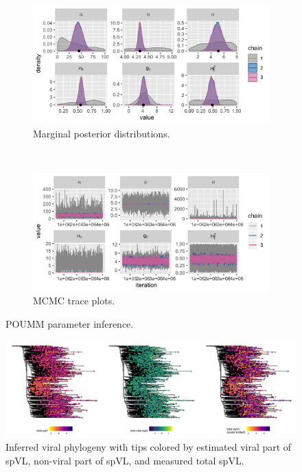 \documentclass[]{article}
\begin{document}
\begin{doublespace}
\begin{figure}[H]
	\centering
	\begin{subfigure}[b]{0.75\textwidth}
		\includegraphics[width=\linewidth]{figures/200207_POUMM_posteriors_zoomed.png}
		\caption{Marginal posterior distributions.}
	\end{subfigure}
~
	\begin{subfigure}[b]{0.75\textwidth}
		\includegraphics[width=\linewidth]{figures/200207_POUMM_traces.png}
		\caption{MCMC trace plots.}
	\end{subfigure}
	\caption{POUMM parameter inference.}\label{fig:poumm-fit}
\end{figure}

\begin{figure}
	\includegraphics[width=\linewidth]{figures/200207_spvl_on_tree}
	\caption{Inferred viral phylogeny with tips colored by estimated viral part of spVL, non-viral part of spVL, and measured total spVL.}
	\label{fig:spvl-on-tree}
\end{figure}


\end{doublespace}
\end{document}
